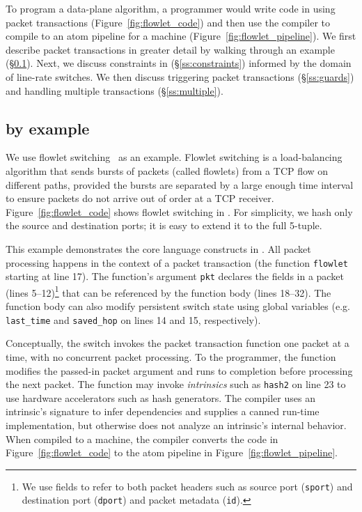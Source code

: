 To program a data-plane algorithm, a programmer would write code in
\pktlanguage using packet transactions (Figure~\ref{fig:flowlet_code})
and then use the \pktlanguage compiler to compile to an atom pipeline
for a \absmachine machine (Figure~\ref{fig:flowlet_pipeline}). We
first describe packet transactions in greater detail by walking
through an example (\S\ref{ss:flowlet}). Next, we discuss constraints
in \pktlanguage (\S\ref{ss:constraints}) informed by the domain of
line-rate switches. We then discuss triggering packet transactions
(\S\ref{ss:guards}) and handling multiple transactions
(\S\ref{ss:multiple}).

\subsection{\pktlanguage by example}
\label{ss:flowlet}

We use flowlet switching~\cite{flowlets} as an example. Flowlet
switching is a load-balancing algorithm that sends bursts of packets
(called flowlets) from a TCP flow on different paths, provided the
bursts are separated by a large enough time interval to ensure packets
do not arrive out of order at a TCP
receiver. Figure~\ref{fig:flowlet_code} shows flowlet switching in
\pktlanguage. For simplicity, we hash only the source and destination
ports; it is easy to extend it to the full 5-tuple.

This example demonstrates the core language constructs in
\pktlanguage. All packet processing happens in the context of a packet
transaction (the function \texttt{flowlet} starting at line 17). The
function's argument {\tt pkt} declares the fields in a packet (lines
5--12)\footnote{We use fields to refer to both packet headers such as
  source port ({\tt sport}) and destination port ({\tt dport}) and
  packet metadata ({\tt id}).} that can be referenced by the function
body (lines 18--32).  The function body can also modify persistent
switch state using global variables (e.g.  \texttt{last\_time} and
\texttt{saved\_hop} on lines 14 and 15, respectively).

Conceptually, the switch invokes the packet transaction function one packet at
a time, with no concurrent packet processing. To the programmer, the function
modifies the passed-in packet argument and runs to completion before processing
the next packet.  The function may invoke \textit{intrinsics} such as
\texttt{hash2} on line 23 to use hardware accelerators such as hash generators.
The \pktlanguage compiler uses an intrinsic's signature to infer dependencies
and supplies a canned run-time implementation, but otherwise does not analyze
an intrinsic's internal behavior. When compiled to a \absmachine machine, the
compiler converts the code in Figure~\ref{fig:flowlet_code} to the atom
pipeline in Figure~\ref{fig:flowlet_pipeline}.

